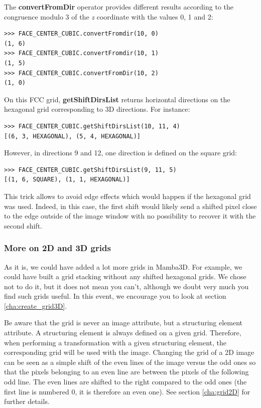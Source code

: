 \documentclass[a4paper,10pt,oneside]{article}
\begin{document}
The \textbf{convertFromDir} operator provides different results according to the
congruence modulo 3 of the \emph{z} coordinate with the values 0, 1 and 2:

\lstset{language=Python}
\begin{lstlisting}
>>> FACE_CENTER_CUBIC.convertFromdir(10, 0)
(1, 6)
>>> FACE_CENTER_CUBIC.convertFromdir(10, 1)
(1, 5)
>>> FACE_CENTER_CUBIC.convertFromDir(10, 2)
(1, 0)
\end{lstlisting}

On this FCC grid, \textbf{getShiftDirsList} returns horizontal directions on the hexagonal grid corresponding to 3D directions. For instance:

\lstset{language=Python}
\begin{lstlisting}
>>> FACE_CENTER_CUBIC.getShiftDirsList(10, 11, 4)
[(6, 3, HEXAGONAL), (5, 4, HEXAGONAL)]
\end{lstlisting}

However, in directions 9 and 12, one direction is defined on the square grid:

\lstset{language=Python}
\begin{lstlisting}
>>> FACE_CENTER_CUBIC.getShiftDirsList(9, 11, 5)
[(1, 6, SQUARE), (1, 1, HEXAGONAL)]
\end{lstlisting}

This trick allows to avoid edge effects which would happen if the hexagonal grid was used. Indeed, in this case, the first shift would
likely send a shifted pixel close to the edge outside of the image window with no possibility to recover it with the second shift.
 
\subsubsection{More on 2D and 3D grids}

As it is, we could have added a lot more grids in Mamba3D. For example,
we could have built a grid stacking without any shifted hexagonal grids.
We chose not to do it, but it does not mean you can't, although we doubt very
much you find such grids useful. In this event, we encourage you to look
at section \ref{cha:create_grid3D}.

Be aware that the grid is never an image attribute, but a structuring element 
attribute. A structuring element is always defined on a given grid. Therefore, 
when performing a transformation with a given structuring element, the corresponding 
grid will be used with the image. Changing the grid of a 2D image can be seen as a 
simple shift of the even lines of the image versus the odd ones so that the pixels 
belonging to an even line are between the pixels of the following odd line. The even 
lines are shifted to the right compared to the odd ones (the first line is numbered 0, 
it is therefore an even one). See section \ref{cha:grid2D} for further details.
\end{document}
